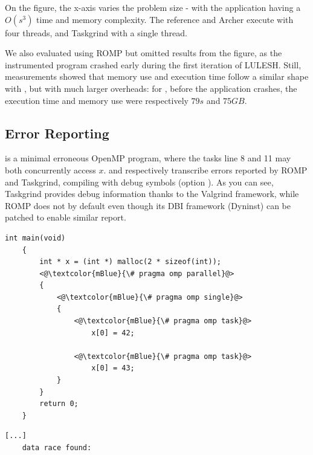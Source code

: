 On the figure, the x-axis varies the problem size  - with the application having a $O(s^3)$ time and memory complexity.
The reference and Archer execute with four threads, and Taskgrind with a single thread.

We also evaluated using ROMP but omitted results from the figure, as the instrumented program crashed early during the first iteration of LULESH.
Still, measurements showed that memory use and execution time follow a similar shape with , but with much larger overheads: for , before the application crashes, the execution time and memory use were respectively $79 s$ and $75GB$.


\subsection{Error Reporting}

 is a minimal erroneous OpenMP program, where the tasks line 8 and 11 may both concurrently access $x$.
 and  respectively transcribe errors reported by ROMP and Taskgrind, compiling with debug symbols (option ).
As you can see, Taskgrind provides debug information thanks to the Valgrind framework, while ROMP does not by default even though its DBI framework (Dyninst) can be patched to enable similar report.

\begin{minipage}{\linewidth}
\begin{lstlisting}[style=CStyle, captionpos=b, caption={task.c - an errorneous OpenMP Program}, label={lst:error-report}]
	int main(void)
	{
		int * x = (int *) malloc(2 * sizeof(int));
		<@\textcolor{mBlue}{\# pragma omp parallel}@>
		{
			<@\textcolor{mBlue}{\# pragma omp single}@>
			{
				<@\textcolor{mBlue}{\# pragma omp task}@>
					x[0] = 42;
				
				<@\textcolor{mBlue}{\# pragma omp task}@>
					x[0] = 43;
			}
		}
		return 0;
	}
\end{lstlisting}
\end{minipage}

\begin{minipage}{\linewidth}
\begin{lstlisting}[style=text, captionpos=b, caption={An error report from ROMP}, label={lst:error-report-romp}]
	[...]
	data race found:
\end{lstlisting}
\end{minipage}


